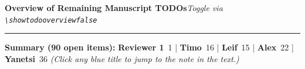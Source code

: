 \documentclass[preprint,12pt,authoryear]{elsarticle}
\newif\ifshowtodooverview
\newcommand{\todobadge}[2]{\colorbox{#1}{\textbf{\scriptsize #2}}}
\newcommand{\badgeTimo}{\todobadge{orange!30}{Timo}}
\newcommand{\badgeLeif}{\todobadge{yellow!40}{Leif}}
\newcommand{\badgeAlex}{\todobadge{blue!25}{Alex}}
\newcommand{\badgeYanetsi}{\todobadge{purple!30}{Yanetsi}}
\newcommand{\badgeRev}{\todobadge{green!35}{Reviewer 1}}
\begin{document}
\ifshowtodooverview
\begingroup
{}
\pagestyle{empty}
\footnotesize
\setlength{\parskip}{2pt}

\hypertarget{todo-overview}{}{\large\bfseries Overview of Remaining Manuscript TODOs}\hfill{\scriptsize\textit{Toggle via \texttt{\textbackslash showtodooverviewfalse}}}\\[3pt]
\hrule
\vspace{4pt}
\noindent\textbf{Summary (90 open items):}\quad
\badgeRev\ 1 \quad|\quad
\badgeTimo\ 16 \quad|\quad
\badgeLeif\ 15 \quad|\quad
\badgeAlex\ 22 \quad|\quad
\badgeYanetsi\ 36 \quad
{\scriptsize\textit{(Click any blue title to jump to the note in the text.)}}
\end{document}
